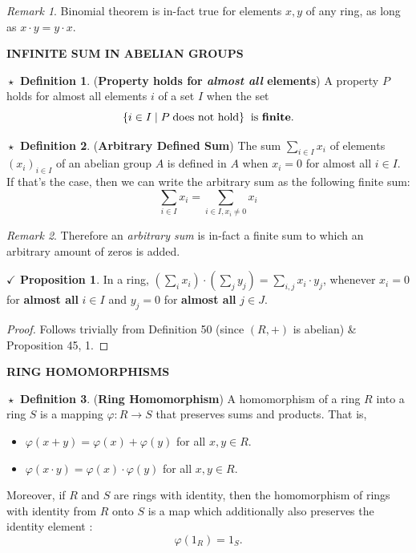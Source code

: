 \documentclass{article}
\theoremstyle{definition}
\newtheorem{definition}{$\boxed{\star}$ Definition}
\theoremstyle{remark}
\newtheorem*{remark}{Remark}
\theoremstyle{definition}
\theoremstyle{definition}
\newtheorem{proposition}{$\checkmark$ Proposition}
\theoremstyle{definition}
\theoremstyle{proof}
\begin{document}
\begin{remark}
	Binomial theorem is in-fact true for elements $ x,y $ of any ring, as long as $ x\cdot y = y\cdot x $.
\end{remark}
\hrulefill
\textbf{INFINITE SUM IN ABELIAN GROUPS}
\hrulefill
\begin{definition}
	(\textbf{Property holds for \textit{almost all} elements}) A property $ P $ holds for almost all elements $ i $ of a set $ I $ when the set
	\[\{i\in I\;\vert\; P\;\text{does not hold}\}\;\;\text{is \textbf{finite}}.\]
\end{definition}
\begin{definition}
	(\textbf{Arbitrary Defined Sum}) The sum $ \sum_{i\in I}x_i $ of elements $ (x_i)_{i\in I} $ of an abelian group $ A $ is defined in $ A $ when $ x_i = 0 $ for almost all $ i\in I $. If that's the case, then we can write the arbitrary sum as the following finite sum:
	\[\sum_{i\in I}x_i = \sum_{i\in I, x_i \neq 0}x_i\]
\end{definition}
\begin{remark}
	Therefore an \textit{arbitrary sum} is in-fact a finite sum to which an arbitrary amount of zeros is added.
\end{remark}
\hrulefill
\begin{proposition}
	In a ring, $ \left (\sum_{i} x_i\right ) \cdot \left (\sum_j y_j\right ) = \sum_{i,j}x_i\cdot y_j$, whenever $ x_i = 0 $ for \textbf{almost all} $ i\in I $ and $ y_j = 0 $ for \textbf{almost all} $ j\in J $.
\end{proposition}
\begin{proof}
	Follows trivially from Definition 50 (since $ (R,+) $ is abelian) \& Proposition 45, 1.
\end{proof}
\hrulefill
\textbf{RING HOMOMORPHISMS}
\hrulefill
\begin{definition}
	(\textbf{Ring Homomorphism}) A homomorphism of a ring $ R $ into a ring $ S $ is a mapping $ \varphi :R\to S $ that preserves sums and products. That is,
	\begin{itemize}
		\item{$ \varphi(x+y)= \varphi(x) + \varphi(y) $ for all $ x,y \in R $.}
		\item{$ \varphi(x\cdot y) = \varphi(x)\cdot \varphi(y) $ for all $ x,y \in R $.}
	\end{itemize}
Moreover, if $ R $ and $ S $ are rings with identity, then the homomorphism of rings with identity from $ R $ onto $ S $ is a map which additionally also preserves the identity element : 
\[\varphi(1_R) = 1_S.\] 
\end{definition}
\end{document}
